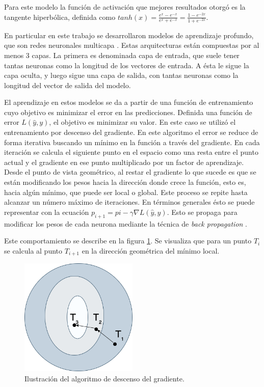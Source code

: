 Para este modelo la función de activación que mejores resultados otorgó es la tangente hiperbólica, definida como $tanh(x) = \frac{e^x - e^{-x}}{e^x + e^{-x}} = \frac{1 - e^{-2x}}{1 + e^{-2x}}$.

En particular en este trabajo se desarrollaron modelos de aprendizaje profundo, que son redes neuronales multicapa \citep{Goodfellow-et-al-2016}. Estas arquitecturas están compuestas por al menos 3 capas. La primera es denominada capa de entrada, que suele tener tantas neuronas como la longitud de los vectores de entrada. A ésta le sigue la capa oculta, y luego sigue una capa de salida, con tantas neuronas como la longitud del vector de salida del modelo.

El aprendizaje en estos modelos se da a partir de una función de entrenamiento cuyo objetivo es minimizar el error en las predicciones. Definida una función de error $L(\hat{y},y)$, el objetivo es minimizar su valor. En este caso se utilizó el entrenamiento por descenso del gradiente. En este algoritmo el error se reduce de forma iterativa buscando un mínimo en la función a través del gradiente. En cada iteración se calcula el siguiente punto en el espacio como una resta entre el punto actual y el gradiente en ese punto multiplicado por un factor de aprendizaje. Desde el punto de vista geométrico, al restar el gradiente lo que sucede es que se están modificando los pesos hacia la dirección donde crece la función, esto es, hacia algún mínimo, que puede ser local o global. Este proceso se repite hasta alcanzar un número máximo de iteraciones. En términos generales ésto se puede representar con la ecuación $p_{i+1} = p{i} - \gamma \nabla L(\hat{y},y)$. Esto se propaga para modificar los pesos de cada neurona mediante la técnica de \textit{back propagation } \citep{Goodfellow-et-al-2016}.

Este comportamiento se describe en la figura \ref{fig:gradient}. Se visualiza que para un punto $T_i$ se calcula al punto $T_{i+1}$ en la dirección geométrica del mínimo local.

\begin{figure}[htbp]
	\centering
	\includegraphics[width=0.5\textwidth]{./Figures/gradient.png}
	\caption{Ilustración del algoritmo de descenso del gradiente.}
	\label{fig:gradient}
\end{figure}

